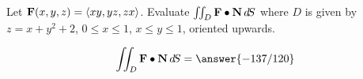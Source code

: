 \documentclass{ximera}
\author{David Guichard \and Neal Koblitz \and H. Jerome Keisler \and Albert Scheller \and Barry Balof \and Mike Wills \and Matthew Carr}
\begin{document}
\begin{exercise}




Let $\mathbf{F}(x,y,z)=\left\langle xy,yz,zx\right\rangle$. Evaluate $\iint_{D}\mathbf{F}\bullet\mathbf{N}\mathop{}\!d\! S$ where $D$ is given by $z=x+y^2+2$, $0\le x\le 1$, $x\le y\le 1$, oriented upwards.

\begin{prompt}
\[
\iint_{D}\vec{F}\dotp\vec{N}\d S=\answer{-137/120}
\]
\end{prompt}


\end{exercise}
\end{document}
